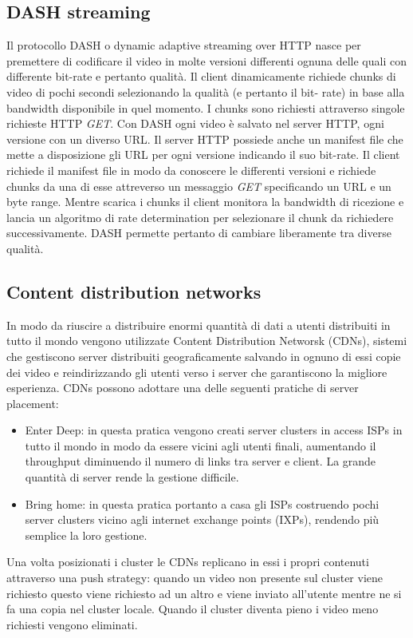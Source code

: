 \subsection{DASH streaming}
Il protocollo DASH o dynamic adaptive streaming over HTTP nasce per premettere di codificare il video in molte versioni differenti ognuna delle quali con 
differente bit-rate e pertanto qualit\`a. Il client dinamicamente richiede chunks di video di pochi secondi selezionando la qualit\`a (e pertanto il bit-
rate) in base alla bandwidth disponibile in quel momento. I chunks sono richiesti attraverso singole richieste HTTP \emph{GET}. Con DASH ogni video \`e 
salvato nel server HTTP, ogni versione con un diverso URL. Il server HTTP possiede anche un manifest file che mette a disposizione gli URL per ogni versione
indicando il suo bit-rate. Il client richiede il manifest file in modo da conoscere le differenti versioni e richiede chunks da una di esse attreverso un
messaggio \emph{GET} specificando un URL e un byte range. Mentre scarica i chunks il client monitora la bandwidth di ricezione e lancia un algoritmo di rate 
determination per selezionare il chunk da richiedere successivamente. DASH permette pertanto di cambiare liberamente tra diverse qualit\`a. 
\subsection{Content distribution networks}
In modo da riuscire a distribuire enormi quantit\`a di dati a utenti distribuiti in tutto il mondo vengono utilizzate Content Distribution Networsk (CDNs),
sistemi che gestiscono server distribuiti geograficamente salvando in ognuno di essi copie dei video e reindirizzando gli utenti verso i server che 
garantiscono la migliore esperienza. CDNs possono adottare una delle seguenti pratiche di server placement:
\begin{itemize}
\item Enter Deep: in questa pratica vengono creati server clusters in access ISPs in tutto il mondo in modo da essere vicini agli utenti finali, aumentando
il throughput diminuendo il numero di links tra server e client. La grande quantit\`a di server rende la gestione difficile. 
\item Bring home: in questa pratica portanto a casa gli ISPs costruendo pochi server clusters vicino agli internet exchange points (IXPs), rendendo pi\`u 
semplice la loro gestione.
\end{itemize}
Una volta posizionati i cluster le CDNs replicano in essi i propri contenuti attraverso una push strategy: quando un video non presente sul cluster viene
richiesto questo viene richiesto ad un altro e viene inviato all'utente mentre ne si fa una copia nel cluster locale. Quando il cluster diventa pieno i 
video meno richiesti vengono eliminati. 
